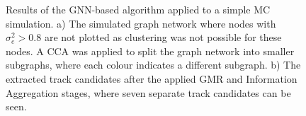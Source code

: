 \begin{figure}[htbp]%
    \centering
    \hfill
    \caption{Results of the GNN-based algorithm applied to a simple MC simulation. a) The simulated graph network where nodes with $\sigma_e^2 > 0.8$ are not plotted as clustering was not possible for these nodes. A CCA was applied to split the graph network into smaller subgraphs, where each colour indicates a different subgraph. b) The extracted track candidates after the applied GMR and Information Aggregation stages, where seven separate track candidates can be seen.}%
    \label{fig:example-application-1}%
\end{figure}

